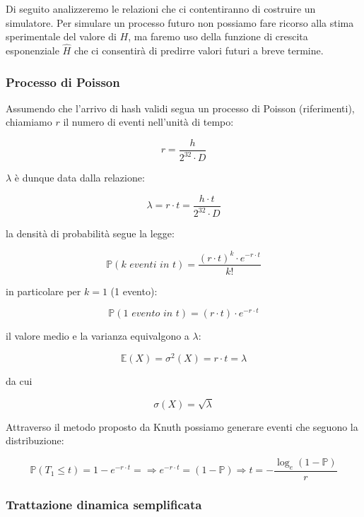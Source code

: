 \documentclass{book}
\theoremstyle{definition}
\begin{document}
Di seguito analizzeremo le relazioni che ci contentiranno di costruire un simulatore.
Per simulare un processo futuro non possiamo fare ricorso alla stima sperimentale del valore di $H$, 
ma faremo uso della funzione di crescita esponenziale $\hat{H}$ che ci consentirà di predirre valori futuri a breve termine.


\subsubsection{Processo di Poisson}

Assumendo che l'arrivo di hash validi segua un processo di Poisson (riferimenti), chiamiamo $r$ il numero di eventi nell'unità di tempo:

$$
r = \frac{h}{2^{32} \cdot D}
$$

$\lambda$ è dunque data dalla relazione:

\begin{equation}   
    \lambda = r \cdot t = \frac{h \cdot t}{2^{32} \cdot D}  \label{lambda_rate}
\end{equation}

la densità di probabilità segue la legge:

$$
    \mathbb{P}(\textit{k eventi in t}) = \frac{(r \cdot t)^{k} \cdot e^{-r \cdot t}}{k!}
$$

in particolare per $k = 1$ (1 evento):

\begin{equation}    
    \mathbb{P}(\textit{1 evento in t}) = (r \cdot t) \cdot e^{-r \cdot t}
\end{equation}


il valore medio e la varianza equivalgono a $\lambda$:

$$
    \mathbb{E}(X) = \sigma^{2}(X) = r \cdot t = \lambda
$$

da cui

$$
    \sigma(X) = \sqrt{\lambda} 
$$

Attraverso il metodo proposto da Knuth possiamo generare eventi che seguono la distribuzione:

$$
    \mathbb{P}(T_{1} \le t) = 1 - e^{-r \cdot t}  = \Rightarrow e^{-r \cdot t} = (1 - \mathbb{P}) \Rightarrow t = - \frac{\log_{e}(1 - \mathbb{P})}{r}
$$

\subsubsection{Trattazione dinamica semplificata}
\end{document}
